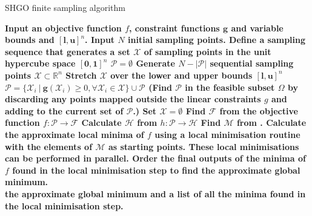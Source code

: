 \begin{algorithm} 
\caption{SHGO finite sampling algorithm}
\label{alg:shgo1}
\begin{algorithmic}[1]
\State \bf{Input} \normalfont an objective function $f$, constraint functions $\mathbf{g}$ and variable bounds and $[\mathbf{l}, \mathbf{u}]^n$.
\State \bf{Input} \normalfont $N$ initial sampling points.
\State Define a sampling sequence that generates a set $\mathcal{X}$ of sampling points in the unit hypercube space $[\mathbf{0}, \mathbf{1}]^n$
\EndProcedure
{}
\State $\mathcal{P} = \emptyset$
\State Generate $N - |\mathcal{P}|$ sequential sampling points $\mathcal{X} \subset \mathbb{R}^n$
\State Stretch $\mathcal{X}$ over the lower and upper bounds $[\mathbf{l}, \mathbf{u}]^n$
\State  $\mathcal{P} = \{\mathcal{X}_i ~|~ \mathbf{g}(\mathcal{X}_i) \geq 0, \forall \mathcal{X}_i \in \mathcal{X}\} \cup\mathcal{P}$ 
\Comment (Find $\mathcal{P}$ in the feasible subset $\Omega$ by discarding any points mapped outside the linear constraints $g$ and adding to the current set of $\mathcal{P}$.)
\State Set $\mathcal{X} = \emptyset$
\EndWhile
\State Find $\mathcal{F}$ from the objective function $f: \mathcal{P} \rightarrow \mathcal{F}$
\EndProcedure
{}
\State Calculate $\mathcal{H}$ from $h: \mathcal{P}\rightarrow \mathcal{H}$
\EndProcedure
{}
\State Find $\mathcal{M}$ from .
\EndProcedure
{}
\State Calculate the approximate local minima of $f$ using a local minimisation routine with the elements of $\mathcal{M}$ as starting points.
\Comment These local minimisations can be performed in parallel.
\EndProcedure
{}
\State Order the final outputs of the minima of $f$ found in the local minimisation step to find the approximate global minimum.
\EndProcedure \\
\Return the approximate global minimum and a list of all the minima found in the local minimisation step.
\end{algorithmic}
\end{algorithm} 





